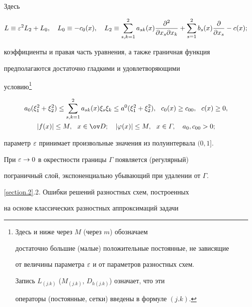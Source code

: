 Здесь


$$


L \equiv \eps^2 L_2+L_0,\quad L_0\equiv-c_0(x),\quad


L_2\equiv \sum_{s,k=1}^2 a_{sk}(x)


\frac{\pa^2}{\pa x_{ s}\pa x_{ k}}+\sum_{s=1}^2b_s(x)


\frac{\pa}{\pa x_s}-c(x);


$$


коэффициенты и правая часть уравнения, а также граничная функция


предполагаются достаточно гладкими и удовлетворяющими


условию\footnote{Здесь и ниже через $M$ (через $m$) обозначаем


достаточно большие (малые) положительные постоянные, не зависящие


от величины параметра $\varepsilon$ и от параметров разностных схем.


Запись $L_{(j.k)}$ ($M_{(j.k)}$, $D_{h(j.k)}$) означает, что эти


операторы (постоянные, сетки) введены в формуле $(j.k)$.}


\begin{gather} \label{eq.2.2}


a_0(\xi_1^2+\xi_2^2)\leq \sum_{s,k=1}^2


a_{sk}(x)\xi_s \xi_k \leq a^0(\xi_1^2+\xi_2^2), \ \


c_0(x)\geq c_{00},\ \ c(x)\geq 0, \\


|f(x)|\leq M, \ \ x\in \od; \quad


|\vp(x)|\leq M, \ \ x\in\varGamma, \quad a_0,c_{00}>0; \notag


\end{gather}


параметр $\varepsilon$ принимает произвольные значения из полуинтервала $(0,1]$.





При $\varepsilon\rightarrow 0$ в окрестности границы $\varGamma$ появляется (регулярный)


пограничный слой, экспоненциально убывающий при удалении от $\varGamma$.


\medskip





{\ref{section.2}.2.} Ошибки решений разностных схем, построенных


на основе классических разностных аппроксимаций задачи


